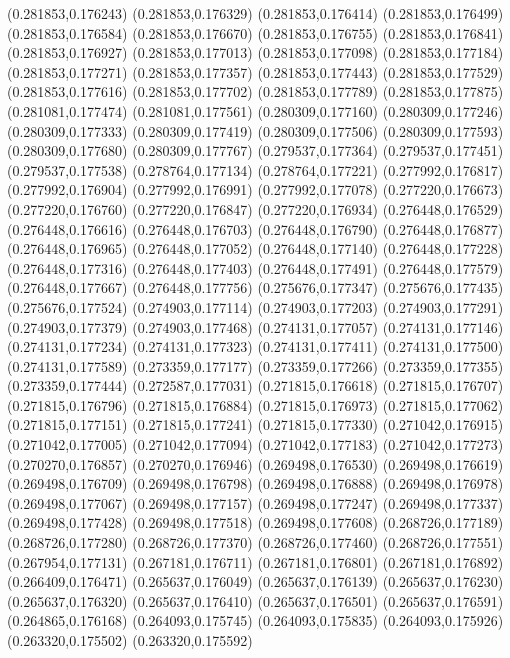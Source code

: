 (0.281853,0.176243)
(0.281853,0.176329)
(0.281853,0.176414)
(0.281853,0.176499)
(0.281853,0.176584)
(0.281853,0.176670)
(0.281853,0.176755)
(0.281853,0.176841)
(0.281853,0.176927)
(0.281853,0.177013)
(0.281853,0.177098)
(0.281853,0.177184)
(0.281853,0.177271)
(0.281853,0.177357)
(0.281853,0.177443)
(0.281853,0.177529)
(0.281853,0.177616)
(0.281853,0.177702)
(0.281853,0.177789)
(0.281853,0.177875)
(0.281081,0.177474)
(0.281081,0.177561)
(0.280309,0.177160)
(0.280309,0.177246)
(0.280309,0.177333)
(0.280309,0.177419)
(0.280309,0.177506)
(0.280309,0.177593)
(0.280309,0.177680)
(0.280309,0.177767)
(0.279537,0.177364)
(0.279537,0.177451)
(0.279537,0.177538)
(0.278764,0.177134)
(0.278764,0.177221)
(0.277992,0.176817)
(0.277992,0.176904)
(0.277992,0.176991)
(0.277992,0.177078)
(0.277220,0.176673)
(0.277220,0.176760)
(0.277220,0.176847)
(0.277220,0.176934)
(0.276448,0.176529)
(0.276448,0.176616)
(0.276448,0.176703)
(0.276448,0.176790)
(0.276448,0.176877)
(0.276448,0.176965)
(0.276448,0.177052)
(0.276448,0.177140)
(0.276448,0.177228)
(0.276448,0.177316)
(0.276448,0.177403)
(0.276448,0.177491)
(0.276448,0.177579)
(0.276448,0.177667)
(0.276448,0.177756)
(0.275676,0.177347)
(0.275676,0.177435)
(0.275676,0.177524)
(0.274903,0.177114)
(0.274903,0.177203)
(0.274903,0.177291)
(0.274903,0.177379)
(0.274903,0.177468)
(0.274131,0.177057)
(0.274131,0.177146)
(0.274131,0.177234)
(0.274131,0.177323)
(0.274131,0.177411)
(0.274131,0.177500)
(0.274131,0.177589)
(0.273359,0.177177)
(0.273359,0.177266)
(0.273359,0.177355)
(0.273359,0.177444)
(0.272587,0.177031)
(0.271815,0.176618)
(0.271815,0.176707)
(0.271815,0.176796)
(0.271815,0.176884)
(0.271815,0.176973)
(0.271815,0.177062)
(0.271815,0.177151)
(0.271815,0.177241)
(0.271815,0.177330)
(0.271042,0.176915)
(0.271042,0.177005)
(0.271042,0.177094)
(0.271042,0.177183)
(0.271042,0.177273)
(0.270270,0.176857)
(0.270270,0.176946)
(0.269498,0.176530)
(0.269498,0.176619)
(0.269498,0.176709)
(0.269498,0.176798)
(0.269498,0.176888)
(0.269498,0.176978)
(0.269498,0.177067)
(0.269498,0.177157)
(0.269498,0.177247)
(0.269498,0.177337)
(0.269498,0.177428)
(0.269498,0.177518)
(0.269498,0.177608)
(0.268726,0.177189)
(0.268726,0.177280)
(0.268726,0.177370)
(0.268726,0.177460)
(0.268726,0.177551)
(0.267954,0.177131)
(0.267181,0.176711)
(0.267181,0.176801)
(0.267181,0.176892)
(0.266409,0.176471)
(0.265637,0.176049)
(0.265637,0.176139)
(0.265637,0.176230)
(0.265637,0.176320)
(0.265637,0.176410)
(0.265637,0.176501)
(0.265637,0.176591)
(0.264865,0.176168)
(0.264093,0.175745)
(0.264093,0.175835)
(0.264093,0.175926)
(0.263320,0.175502)
(0.263320,0.175592)

